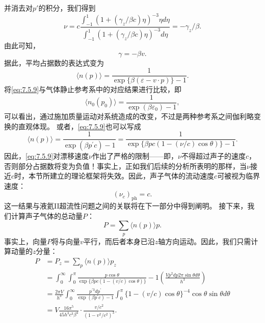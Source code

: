 并消去对\(p'\)的积分，我们得到
\begin{equation}\tag{7.5.7}\label{eq:7.5.7}
\nu = c \frac { \int _ { - 1 } ^{1} ( 1 + ( \gamma _ { z } / \beta c ) \eta ) ^{- 3} \eta d \eta } { \int _ { - 1 } ^{1} ( 1 + ( \gamma _ { z } / \beta c ) \eta ) ^{- 3} d \eta } = - \gamma _ { z } / \beta .
\end{equation}
由此可知，
\begin{equation}\tag{7.5.8}\label{eq:7.5.8}
\gamma = - \beta v .
\end{equation}
据此，平均占据数的表达式变为
\begin{equation}\tag{7.5.9}\label{eq:7.5.9}
\langle n ( p ) \rangle = \frac { 1 } { \exp \{ \beta ( \varepsilon - v \cdot p ) \} - 1 } .
\end{equation}
将\autoref{eq:7.5.9}与气体静止参考系中的对应结果进行比较，即
\begin{equation}\tag{7.5.10}\label{eq:7.5.10}
\langle n _ { 0 } ( p _ { 0 } ) \rangle = \frac { 1 } { \exp ( \beta \varepsilon _ { 0 } ) - 1 } ,
\end{equation}
可以看出，通过施加质量运动对系统造成的改变，不过是两种参考系之间伽利略变换的直观体现。
或者，\autoref{eq:7.5.9}也可以写成
\begin{equation}\tag{7.5.11}\label{eq:7.5.11}
\langle n ( p ) \rangle = \frac { 1 } { \exp ( \beta p ^{\prime} c ) - 1 } = \frac { 1 } { \exp \{ \beta p c ( 1 - ( \nu / c ) \cos \theta ) \} - 1 } .
\end{equation}
因此，\autoref{eq:7.5.9}对漂移速度\(\nu\)作出了严格的限制——即，\(\nu\)不得超过声子的速度\(c\)，否则部分占据数将变为负值！事实上，正如我们后续的分析所表明的那样，当\(\nu\)接近\(c\)时，本节所建立的理论框架将失效。因此，声子气体的流动速度\(c\)可被视为临界速度：
\begin{equation}\tag{7.5.12}\label{eq:7.5.12}
( \nu _ { c } ) _ { \mathrm { p h } } = c .
\end{equation}
这一结果与液氦II超流性问题之间的关联将在下一部分中得到阐明。
接下来，我们计算声子气体的总动量\(P\)：
\begin{equation}\tag{7.5.13}\label{eq:7.5.13}
P = \sum _ { p } \langle n ( p ) \rangle p .
\end{equation}
事实上，向量\(P\)将与向量\(v\)平行，而后者本身已沿\(z\)轴方向运动。因此，我们只需计算动量的\(z\)分量：
\begin{equation}\tag{7.5.14}\label{eq:7.5.14}
\begin{aligned} P & = P _ { z } = \sum _ { p } \langle n ( p ) \rangle p _ { z } \\& = \int _ { 0 } ^{\infty} \int _ { 0 } ^{\pi} \frac { p \cos \theta } { \exp \{ \beta p c ( 1 - ( v / c ) \cos \theta ) \} } - 1 \left( \frac { V p ^{2} d p 2 \pi \sin \theta d \theta } { h ^{3} } \right) \\& = \frac { 2 \pi V } { h ^{3} } \int _ { 0 } ^{\infty} \frac { p ^{\prime 3} d p ^{\prime} } { \exp ( \beta p ^{\prime} c ) - 1 } \int _ { 0 } ^{\pi} \{ 1 - ( v / c ) \cos \theta \} ^{- 4} \cos \theta \sin \theta d \theta \\& = V \frac { 16 \pi ^{5} } { 45 h ^{3} c ^{3} \beta ^{4} } \cdot \frac { v / c ^{2} } { ( 1 - v ^{2} / c ^{2} ) ^{3} } . \end{aligned}
\end{equation}
